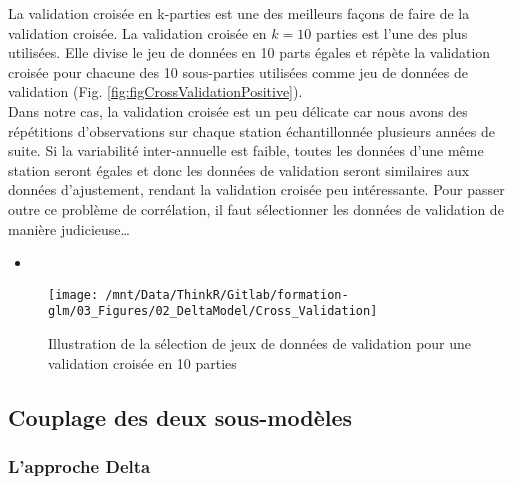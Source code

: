 \documentclass[french,a4paper]{article}
\begin{document}
La validation croisée en k-parties est une des meilleurs façons de faire de la validation croisée. La validation croisée en \(k = 10\) parties est l'une des plus utilisées. Elle divise le jeu de données en 10 parts égales et répète la validation croisée pour chacune des 10 sous-parties utilisées comme jeu de données de validation (Fig. \ref{fig:figCrossValidationPositive}).\\
Dans notre cas, la validation croisée est un peu délicate car nous avons des répétitions d'observations sur chaque station échantillonnée plusieurs années de suite. Si la variabilité inter-annuelle est faible, toutes les données d'une même station seront égales et donc les données de validation seront similaires aux données d'ajustement, rendant la validation croisée peu intéressante.  Pour passer outre ce problème de corrélation, il faut sélectionner les données de validation de manière judicieuse\ldots{}



\begin{itemize}
\item
\end{itemize}

\begin{figure}[!h]

{\centering \texttt{[image: /mnt/Data/ThinkR/Gitlab/formation-glm/03\_Figures/02\_DeltaModel/Cross\_Validation]} 

}

\caption{Illustration de la sélection de jeux de données de validation pour une validation croisée en 10 parties}\label{fig:figCrossValidationPositivePAM}
\end{figure}

\hypertarget{couplage-des-deux-sous-modeles}{%
\subsection{Couplage des deux sous-modèles}\label{couplage-des-deux-sous-modeles}}

\hypertarget{lapproche-delta}{%
\subsubsection{L'approche Delta}\label{lapproche-delta}}
\end{document}
